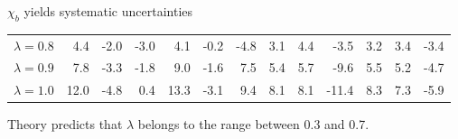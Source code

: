 \begin{frame}{$\chi_b$ yields systematic uncertainties}
{\begin{tabular}{lrrrrrrrrrrrr}
\rule{0pt}{4ex}$\lambda=0.8$ & 4.4 & -2.0 & -3.0 & 4.1 & -0.2 & -4.8 & 3.1 & 4.4 & -3.5 & 3.2 & 3.4 & -3.4\\
$\lambda=0.9$ & 7.8 & -3.3 & -1.8 & 9.0 & -1.6 & 7.5 & 5.4 & 5.7 & -9.6 & 5.5 & 5.2 & -4.7\\
$\lambda=1.0$ & 12.0 & -4.8 & 0.4 & 13.3 & -3.1 & 9.4 & 8.1 & 8.1 & -11.4 & 8.3 & 7.3 & -5.9\\
\bottomrule
\end{tabular}

}

\begin{block}{}
\centering
\tiny
Theory predicts that $\lambda$ belongs to the range between 0.3 and 0.7. 
\end{block}

\end{frame}
